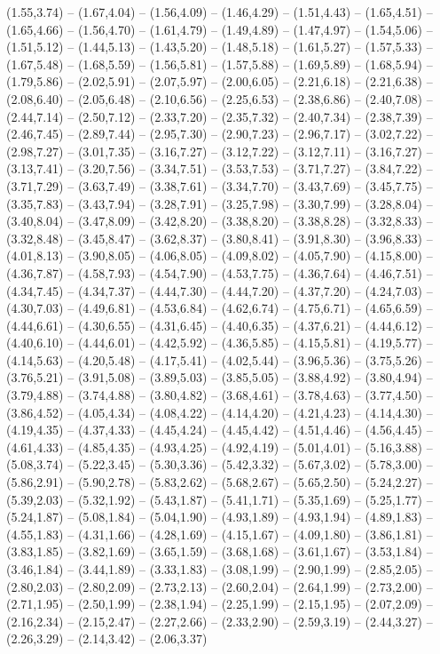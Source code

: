 \expandafter\def\csname geo:Heute:West\endcsname{
  (1.55,3.74) -- (1.67,4.04) -- (1.56,4.09) -- (1.46,4.29) -- (1.51,4.43) -- (1.65,4.51) -- (1.65,4.66) -- (1.56,4.70) -- (1.61,4.79) -- (1.49,4.89) -- (1.47,4.97) -- (1.54,5.06) -- (1.51,5.12) -- (1.44,5.13) -- (1.43,5.20) -- (1.48,5.18) -- (1.61,5.27) -- (1.57,5.33) -- (1.67,5.48) -- (1.68,5.59) -- (1.56,5.81) -- (1.57,5.88) -- (1.69,5.89) -- (1.68,5.94) -- (1.79,5.86) -- (2.02,5.91) -- (2.07,5.97) -- (2.00,6.05) -- (2.21,6.18) -- (2.21,6.38) -- (2.08,6.40) -- (2.05,6.48) -- (2.10,6.56) -- (2.25,6.53) -- (2.38,6.86) -- (2.40,7.08) -- (2.44,7.14) -- (2.50,7.12) -- (2.33,7.20) -- (2.35,7.32) -- (2.40,7.34) -- (2.38,7.39) -- (2.46,7.45) -- (2.89,7.44) -- (2.95,7.30) -- (2.90,7.23) -- (2.96,7.17) -- (3.02,7.22) -- (2.98,7.27) -- (3.01,7.35) -- (3.16,7.27) -- (3.12,7.22) -- (3.12,7.11) -- (3.16,7.27) -- (3.13,7.41) -- (3.20,7.56) -- (3.34,7.51) -- (3.53,7.53) -- (3.71,7.27) -- (3.84,7.22) -- (3.71,7.29) -- (3.63,7.49) -- (3.38,7.61) -- (3.34,7.70) -- (3.43,7.69) -- (3.45,7.75) -- (3.35,7.83) -- (3.43,7.94) -- (3.28,7.91) -- (3.25,7.98) -- (3.30,7.99) -- (3.28,8.04) -- (3.40,8.04) -- (3.47,8.09) -- (3.42,8.20) -- (3.38,8.20) -- (3.38,8.28) -- (3.32,8.33) -- (3.32,8.48) -- (3.45,8.47) -- (3.62,8.37) -- (3.80,8.41) -- (3.91,8.30) -- (3.96,8.33) -- (4.01,8.13) -- (3.90,8.05) -- (4.06,8.05) -- (4.09,8.02) -- (4.05,7.90) -- (4.15,8.00) -- (4.36,7.87) -- (4.58,7.93) -- (4.54,7.90) -- (4.53,7.75) -- (4.36,7.64) -- (4.46,7.51) -- (4.34,7.45) -- (4.34,7.37) -- (4.44,7.30) -- (4.44,7.20) -- (4.37,7.20) -- (4.24,7.03) -- (4.30,7.03) -- (4.49,6.81) -- (4.53,6.84) -- (4.62,6.74) -- (4.75,6.71) -- (4.65,6.59) -- (4.44,6.61) -- (4.30,6.55) -- (4.31,6.45) -- (4.40,6.35) -- (4.37,6.21) -- (4.44,6.12) -- (4.40,6.10) -- (4.44,6.01) -- (4.42,5.92) -- (4.36,5.85) -- (4.15,5.81) -- (4.19,5.77) -- (4.14,5.63) -- (4.20,5.48) -- (4.17,5.41) -- (4.02,5.44) -- (3.96,5.36) -- (3.75,5.26) -- (3.76,5.21) -- (3.91,5.08) -- (3.89,5.03) -- (3.85,5.05) -- (3.88,4.92) -- (3.80,4.94) -- (3.79,4.88) -- (3.74,4.88) -- (3.80,4.82) -- (3.68,4.61) -- (3.78,4.63) -- (3.77,4.50) -- (3.86,4.52) -- (4.05,4.34) -- (4.08,4.22) -- (4.14,4.20) -- (4.21,4.23) -- (4.14,4.30) -- (4.19,4.35) -- (4.37,4.33) -- (4.45,4.24) -- (4.45,4.42) -- (4.51,4.46) -- (4.56,4.45) -- (4.61,4.33) -- (4.85,4.35) -- (4.93,4.25) -- (4.92,4.19) -- (5.01,4.01) -- (5.16,3.88) -- (5.08,3.74) -- (5.22,3.45) -- (5.30,3.36) -- (5.42,3.32) -- (5.67,3.02) -- (5.78,3.00) -- (5.86,2.91) -- (5.90,2.78) -- (5.83,2.62) -- (5.68,2.67) -- (5.65,2.50) -- (5.24,2.27) -- (5.39,2.03) -- (5.32,1.92) -- (5.43,1.87) -- (5.41,1.71) -- (5.35,1.69) -- (5.25,1.77) -- (5.24,1.87) -- (5.08,1.84) -- (5.04,1.90) -- (4.93,1.89) -- (4.93,1.94) -- (4.89,1.83) -- (4.55,1.83) -- (4.31,1.66) -- (4.28,1.69) -- (4.15,1.67) -- (4.09,1.80) -- (3.86,1.81) -- (3.83,1.85) -- (3.82,1.69) -- (3.65,1.59) -- (3.68,1.68) -- (3.61,1.67) -- (3.53,1.84) -- (3.46,1.84) -- (3.44,1.89) -- (3.33,1.83) -- (3.08,1.99) -- (2.90,1.99) -- (2.85,2.05) -- (2.80,2.03) -- (2.80,2.09) -- (2.73,2.13) -- (2.60,2.04) -- (2.64,1.99) -- (2.73,2.00) -- (2.71,1.95) -- (2.50,1.99) -- (2.38,1.94) -- (2.25,1.99) -- (2.15,1.95) -- (2.07,2.09) -- (2.16,2.34) -- (2.15,2.47) -- (2.27,2.66) -- (2.33,2.90) -- (2.59,3.19) -- (2.44,3.27) -- (2.26,3.29) -- (2.14,3.42) -- (2.06,3.37) }
